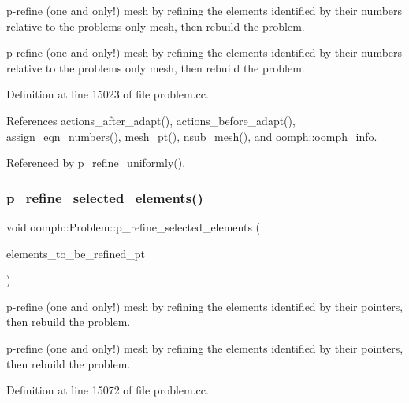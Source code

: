p-\/refine (one and only!) mesh by refining the elements identified by their numbers relative to the problems\textquotesingle{} only mesh, then rebuild the problem. 

p-\/refine (one and only!) mesh by refining the elements identified by their numbers relative to the problems\textquotesingle{} only mesh, then rebuild the problem. 

Definition at line 15023 of file problem.\+cc.



References actions\+\_\+after\+\_\+adapt(), actions\+\_\+before\+\_\+adapt(), assign\+\_\+eqn\+\_\+numbers(), mesh\+\_\+pt(), nsub\+\_\+mesh(), and oomph\+::oomph\+\_\+info.



Referenced by p\+\_\+refine\+\_\+uniformly().

\mbox{\label{classoomph_1_1Problem_a94a6f82647f9921c387ac5549a7098d6}} 
\subsubsection{\texorpdfstring{p\+\_\+refine\+\_\+selected\+\_\+elements()}{p\_refine\_selected\_elements()}\hspace{0.1cm}{\footnotesize\ttfamily [2/6]}}
{\footnotesize\ttfamily void oomph\+::\+Problem\+::p\+\_\+refine\+\_\+selected\+\_\+elements (\begin{DoxyParamCaption}\item[{const \hyperlink{classoomph_1_1Vector}{Vector}$<$ \hyperlink{classoomph_1_1PRefineableElement}{P\+Refineable\+Element} $\ast$$>$ \&}]{elements\+\_\+to\+\_\+be\+\_\+refined\+\_\+pt }\end{DoxyParamCaption})}



p-\/refine (one and only!) mesh by refining the elements identified by their pointers, then rebuild the problem. 

p-\/refine (one and only!) mesh by refining the elements identified by their pointers, then rebuild the problem. 

Definition at line 15072 of file problem.\+cc.




